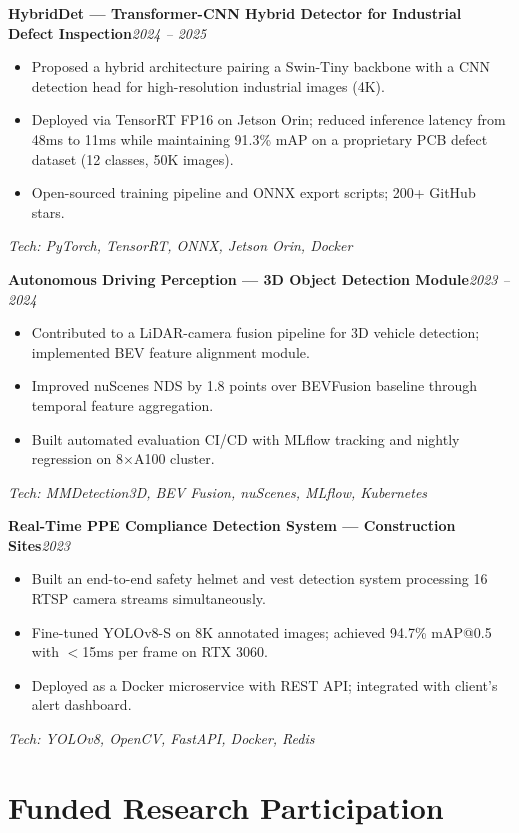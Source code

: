 \documentclass[11pt,a4paper]{article}
\newcommand{\cvproject}[4]{%
    \textbf{#1}\hfill\textit{#2}\par\vspace{2pt}%
    #3\par\vspace{1pt}%
    {\small\color{subtext}\textit{Tech: #4}}\par\vspace{7pt}%
}
\begin{document}
\cvproject{HybridDet --- Transformer-CNN Hybrid Detector for Industrial Defect Inspection}{2024 -- 2025}{%
    \begin{itemize}[leftmargin=14pt, nosep, topsep=2pt, itemsep=1pt]
        \item Proposed a hybrid architecture pairing a Swin-Tiny backbone with a CNN detection head for high-resolution industrial images (4K).
        \item Deployed via TensorRT FP16 on Jetson Orin; reduced inference latency from 48ms to 11ms while maintaining 91.3\% mAP on a proprietary PCB defect dataset (12 classes, 50K images).
        \item Open-sourced training pipeline and ONNX export scripts; 200+ GitHub stars.
    \end{itemize}
}{PyTorch, TensorRT, ONNX, Jetson Orin, Docker}

\cvproject{Autonomous Driving Perception --- 3D Object Detection Module}{2023 -- 2024}{%
    \begin{itemize}[leftmargin=14pt, nosep, topsep=2pt, itemsep=1pt]
        \item Contributed to a LiDAR-camera fusion pipeline for 3D vehicle detection; implemented BEV feature alignment module.
        \item Improved nuScenes NDS by 1.8 points over BEVFusion baseline through temporal feature aggregation.
        \item Built automated evaluation CI/CD with MLflow tracking and nightly regression on 8$\times$A100 cluster.
    \end{itemize}
}{MMDetection3D, BEV Fusion, nuScenes, MLflow, Kubernetes}

\cvproject{Real-Time PPE Compliance Detection System --- Construction Sites}{2023}{%
    \begin{itemize}[leftmargin=14pt, nosep, topsep=2pt, itemsep=1pt]
        \item Built an end-to-end safety helmet and vest detection system processing 16 RTSP camera streams simultaneously.
        \item Fine-tuned YOLOv8-S on 8K annotated images; achieved 94.7\% mAP@0.5 with $<$15ms per frame on RTX 3060.
        \item Deployed as a Docker microservice with REST API; integrated with client's alert dashboard.
    \end{itemize}
}{YOLOv8, OpenCV, FastAPI, Docker, Redis}

\section{Funded Research Participation}
\end{document}
